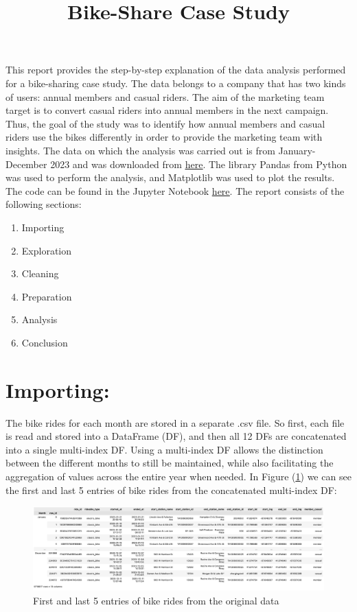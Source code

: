 \documentclass[12pt]{article}
\begin{document}
\title{Bike-Share Case Study}
\date{}
\maketitle

This report provides the step-by-step explanation of the data analysis performed for a bike-sharing case study. The data belongs to a company that has two kinds of users: annual members and casual riders. The aim of the marketing team target is to convert casual riders into annual members in the next campaign. Thus, the goal of the study was to identify how annual members and casual riders use the bikes differently in order to provide the marketing team with insights. The data on which the analysis was carried out is from January-December 2023 and was downloaded from \href{https://divvy-tripdata.s3.amazonaws.com/index.html}{\underline{here}}. The library Pandas from Python was used to perform the analysis, and Matplotlib was used to plot the results. The code can be found in the Jupyter Notebook \href{https://github.com/SummerKassem/BikeShareCS/blob/main/PythonCode/bike_share_analysis.ipynb}{\underline{here}}. The report consists of the following sections:
\begin{enumerate} 
	\item Importing
	\item Exploration
	\item Cleaning
	\item Preparation
	\item Analysis
	\item Conclusion
\end{enumerate}

\section{Importing:}

The bike rides for each month are stored in a separate .csv file. So first, each file is read and stored into a DataFrame (DF), and then all 12 DFs are concatenated into a single multi-index DF. Using a multi-index DF allows the distinction between the different months to still be maintained, while also facilitating the aggregation of values across the entire year when needed. In Figure (\underline{\ref{fig1}}) we can see the first and last 5 entries of bike rides from the concatenated multi-index DF:

	\begin{figure}[h]
	\centering
	\includegraphics[scale=0.4]{original_data.png}
	\caption{First and last 5 entries of bike rides from the original data}
	\label{fig1}
	\end{figure}
	\pagebreak
	
\end{document}
